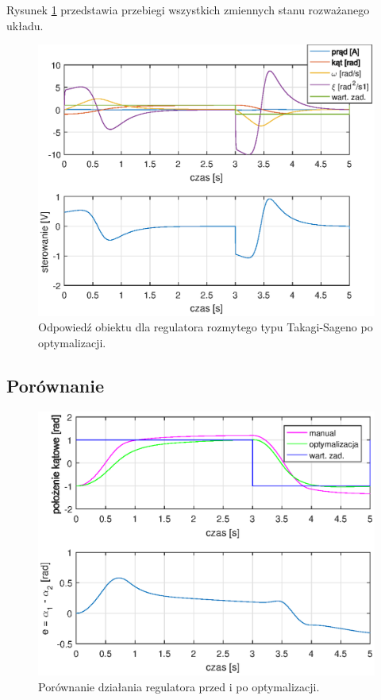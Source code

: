 \FloatBarrier
Rysunek \ref{fuzzy_sageno_odp} przedstawia przebiegi wszystkich zmiennych stanu rozważanego układu.
\begin{figure}[h!]
	\centering
	\includegraphics[scale = 1]{fig/fuzzy_sagenoOpt_odp.eps}
	\caption		
	{Odpowied\'z obiektu dla regulatora rozmytego typu Takagi-Sageno po optymalizacji.}
	\label{fuzzy_sageno_odp}
\end{figure}

\subsection{Porównanie}
\begin{figure}[h!]
	\centering
	\includegraphics[scale = 0.8]{fig/por_fuzzy_sageno.eps}
	\caption		
	{Porównanie działania regulatora przed i po optymalizacji.}
	\label{fuzzy_sageno_por}
\end{figure}


